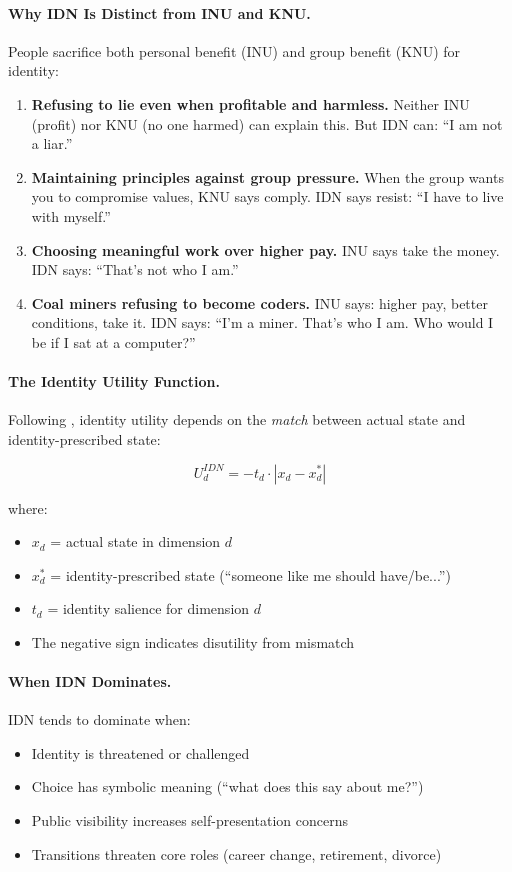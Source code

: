 \paragraph{Why IDN Is Distinct from INU and KNU.}
People sacrifice both personal benefit (INU) and group benefit (KNU) for identity:

\begin{enumerate}
\item \textbf{Refusing to lie even when profitable and harmless.}
Neither INU (profit) nor KNU (no one harmed) can explain this.
But IDN can: ``I am not a liar.''

\item \textbf{Maintaining principles against group pressure.}
When the group wants you to compromise values, KNU says comply.
IDN says resist: ``I have to live with myself.''

\item \textbf{Choosing meaningful work over higher pay.}
INU says take the money. IDN says: ``That's not who I am.''

\item \textbf{Coal miners refusing to become coders.}
INU says: higher pay, better conditions, take it.
IDN says: ``I'm a miner. That's who I am. Who would I be if I sat at a computer?''
\end{enumerate}

\paragraph{The Identity Utility Function.}
Following \citet{akerlofkranton}, identity utility depends on the 
\emph{match} between actual state and identity-prescribed state:

\begin{equation}
U^{IDN}_d = -t_d \cdot |x_d - x^*_d|
\label{eq:identity-match}
\end{equation}

where:
\begin{itemize}
\item $x_d$ = actual state in dimension $d$
\item $x^*_d$ = identity-prescribed state (``someone like me should have/be...'')
\item $t_d$ = identity salience for dimension $d$
\item The negative sign indicates disutility from mismatch
\end{itemize}

\paragraph{When IDN Dominates.}
IDN tends to dominate when:
\begin{itemize}
\item Identity is threatened or challenged
\item Choice has symbolic meaning (``what does this say about me?'')
\item Public visibility increases self-presentation concerns
\item Transitions threaten core roles (career change, retirement, divorce)
\end{itemize}

